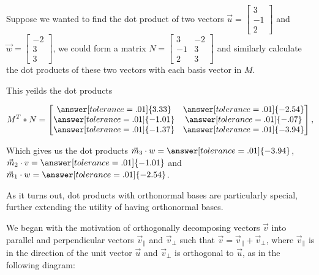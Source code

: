 \documentclass{ximera}
\begin{document}
\begin{example}
   Suppose we wanted to find the dot product of two vectors $\vec{u}=\begin{bmatrix}
   3\\-1\\2
   \end{bmatrix}$ and $\vec{w}=\begin{bmatrix}
      -2\\3\\3
   \end{bmatrix}$, we could form a matrix $N=\begin{bmatrix}3&-2\\-1&3\\2&3
   \end{bmatrix}$ and similarly calculate the dot products of these two vectors with each basis vector in $M$. 

   This yeilds the dot products

   $$M^T*N=\begin{bmatrix}
      \answer[tolerance=.01]{3.33}&\answer[tolerance=.01]{-2.54}\\\answer[tolerance=.01]{-1.01}&\answer[tolerance=.01]{-.07}\\
      \answer[tolerance=.01]{-1.37}&\answer[tolerance=.01]{-3.94}
   \end{bmatrix},$$

   Which gives us the dot products $\vec{m}_3\cdot w=\answer[tolerance=.01]{-3.94}$, $\vec{m}_2\cdot v=\answer[tolerance=.01]{-1.01}$ and $\vec{m}_1\cdot w=\answer[tolerance=.01]{-2.54}$.

\end{example}

As it turns out, dot products with orthonormal bases are particularly special, further extending the utility of having orthonormal bases.

We began with the motivation of orthogonally decomposing vectors $\vec{v}$ into parallel and perpendicular vectors $\vec{v}_\parallel$ and $\vec{v}_\perp$ such that $\vec{v}=\vec{v}_\parallel+\vec{v}_\perp$, where $\vec{v}_\parallel$ is in the direction of the unit vector $\vec{u}$ and $\vec{v}_\perp$ is orthogonal to $\vec{u}$, as in the following diagram:

\begin{center}
   
  \end{center}
\end{document}
